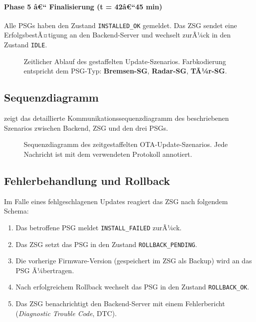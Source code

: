 ﻿\documentclass[12pt,a4paper,twoside]{article}
\begin{document}
\paragraph{Phase 5 â€“ Finalisierung (t = 42â€“45 min)}
Alle PSGs haben den Zustand \texttt{INSTALLED\_OK} gemeldet. Das ZSG
sendet eine ErfolgsbestÃ¤tigung an den Backend-Server und wechselt zurÃ¼ck
in den Zustand \texttt{IDLE}.

\begin{figure}[h!]
  \centering
  
  \caption{Zeitlicher Ablauf des gestaffelten Update-Szenarios.
    Farbkodierung entspricht dem PSG-Typ:
    \textcolor{autosarblue}{\textbf{Bremsen-SG}},
    \textcolor{autosargreen}{\textbf{Radar-SG}},
    \textcolor{autosarorange}{\textbf{TÃ¼r-SG}}.}
  \label{fig:timeline}
\end{figure}

\subsection{Sequenzdiagramm}
\label{subsec:sequenz}

 zeigt das detaillierte Kommunikationssequenzdiagramm
des beschriebenen Szenarios zwischen Backend, ZSG und den drei PSGs.

\begin{figure}[h!]
  \centering
  
  \caption{Sequenzdiagramm des zeitgestaffelten OTA-Update-Szenarios.
    Jede Nachricht ist mit dem verwendeten Protokoll annotiert.}
  \label{fig:sequence}
\end{figure}

\subsection{Fehlerbehandlung und Rollback}

Im Falle eines fehlgeschlagenen Updates reagiert das ZSG nach
folgendem Schema:

\begin{enumerate}
  \item Das betroffene PSG meldet \texttt{INSTALL\_FAILED} zurÃ¼ck.
  \item Das ZSG setzt das PSG in den Zustand \texttt{ROLLBACK\_PENDING}.
  \item Die vorherige Firmware-Version (gespeichert im ZSG als Backup)
    wird an das PSG Ã¼bertragen.
  \item Nach erfolgreichem Rollback wechselt das PSG in den Zustand
    \texttt{ROLLBACK\_OK}.
  \item Das ZSG benachrichtigt den Backend-Server mit einem
    Fehlerbericht (\textit{Diagnostic Trouble Code}, DTC).
\end{enumerate}
\end{document}
